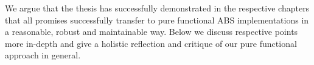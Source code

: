 We argue that the thesis has successfully demonstrated in the respective chapters that all promises successfully transfer to pure functional ABS implementations in a reasonable, robust and maintainable way. Below we discuss respective points more in-depth and give a holistic reflection and critique of our pure functional approach in general.











